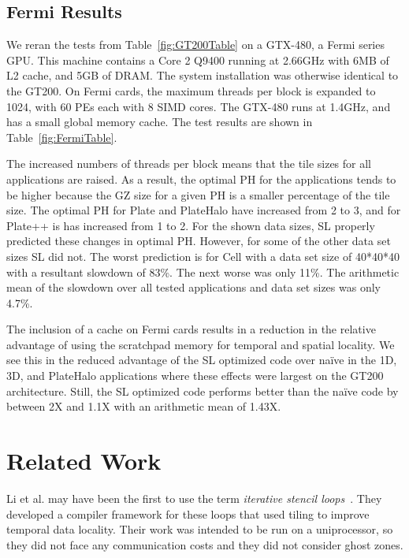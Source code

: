 \documentclass[preprint,nocopyrightspace]{styles/sigplanconf}
\begin{document}
\subsection{Fermi Results}

We reran the tests from Table~\ref{fig:GT200Table} on a GTX-480, a Fermi series
GPU.  This machine contains a Core 2 Q9400 running at
2.66GHz with 6MB of L2 cache, and 5GB of DRAM.  The system installation was
otherwise identical to the GT200.  On Fermi cards, the maximum
threads per block is expanded to 1024, with 60 PEs each with 8 SIMD cores.  The
GTX-480 runs at 1.4GHz, and has a small global memory cache.  The test results are
shown in Table~\ref{fig:FermiTable}.

The increased numbers of threads per block means that the tile sizes for all
applications are raised.  As a result, the optimal PH for the applications
tends to be higher because the GZ size for a given PH is a smaller percentage
of the tile size.  The optimal PH for Plate and PlateHalo have increased from 2
to 3, and for Plate++ is has increased from 1 to 2.  For the shown data sizes,
SL properly predicted these changes in optimal PH.  However, for some of the
other data set sizes SL did not.  The worst prediction is for Cell with a data
set size of 40*40*40 with a resultant slowdown of 83\%.  The next worse was
only 11\%.  The arithmetic mean of the slowdown over all tested applications
and data set sizes was only 4.7\%.

The inclusion of a cache on Fermi cards results in a reduction in the relative
advantage of using the scratchpad memory for temporal and spatial
locality.  We see this in the reduced advantage of the SL optimized code
over na\"{i}ve in the 1D, 3D, and PlateHalo applications where these
effects were largest on the GT200 architecture.  Still, the SL optimized code
performs better than the na\"{i}ve code by between 2X and 1.1X with an
arithmetic mean of 1.43X.

\section{Related Work}

Li et al. may have been the first to use the term
{\em iterative stencil loops}~\cite{li}.  They developed a compiler
framework for these loops that used tiling to improve temporal data
locality.  Their work was intended to be run on a uniprocessor, so
they did not face any communication costs and they did not consider
ghost zones.
\end{document}
